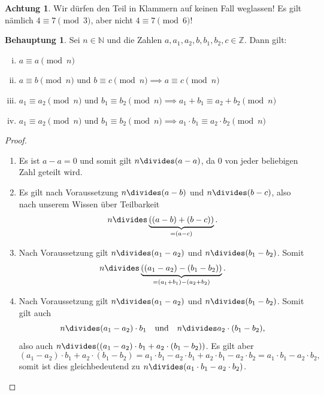\documentclass[a4paper,ngerman,12pt]{scrartcl}
\newcommand{\N}{\mathbb{N}}
\newcommand{\Z}{\mathbb{Z}}
\theoremstyle{definition}
\newtheorem{satz}{Behauptung}
\newtheorem*{acht}{Achtung}
\newenvironment{satzliste}{\begin{enumerate}[(i)]}{\end{enumerate}}
\newenvironment{beweisliste}{\begin{enumerate}[Zu (i):]}{\end{enumerate}}
\begin{document}
\begin{acht}
  Wir dürfen den Teil in Klammern auf keinen Fall weglassen! Es gilt nämlich
  $4 \equiv 7 \pmod{3}$, aber nicht $4 \equiv 7 \pmod{6}$!
\end{acht}

\begin{satz}
  Sei $n \in \N$ und die Zahlen $a, a_1, a_2, b, b_1, b_2, c \in \Z$. Dann gilt:
  \begin{satzliste}
    \item $a \equiv a \pmod{n}$
    \item $a \equiv b \pmod{n} \text{ und } b \equiv c \pmod{n} \implies a \equiv c \pmod{n}$
    \item $a_1 \equiv a_2 \pmod{n} \text{ und } b_1 \equiv b_2 \pmod{n} \implies a_1 + b_1 \equiv a_2 + b_2 \pmod{n}$
    \item $a_1 \equiv a_2 \pmod{n} \text{ und } b_1 \equiv b_2 \pmod{n} \implies a_1 \cdot b_1 \equiv a_2 \cdot b_2 \pmod{n}$
  \end{satzliste}
\end{satz}

\begin{proof}
  \begin{beweisliste}
    \item Es ist $a - a = 0$ und somit gilt $n \divides (a - a)$, da $0$ von jeder beliebigen Zahl geteilt wird.
    \item Es gilt nach Voraussetzung $n \divides (a-b)$ und $n \divides (b-c)$, also nach unserem Wissen über Teilbarkeit
    \[ n \divides \underbrace{\left((a-b) + (b-c)\right)}_{= (a - c)}. \]
    \item Nach Voraussetzung gilt $n \divides (a_1 - a_2)$ und $n \divides (b_1 - b_2)$. Somit
    \[ n \divides \underbrace{\left((a_1 - a_2) - (b_1 - b_2)\right)}_{= (a_1 + b_1) - (a_2 + b_2)}. \]
    \item Nach Voraussetzung gilt $n \divides (a_1 - a_2)$ und $n \divides (b_1 - b_2)$. Somit gilt auch
    \[ n \divides (a_1 - a_2) \cdot b_1 \quad \text{und} \quad n \divides a_2 \cdot (b_1 - b_2), \]
    also auch $n \divides ((a_1 - a_2) \cdot b_1 + a_2 \cdot (b_1 - b_2))$. Es gilt aber
    \[ (a_1 - a_2) \cdot b_1 + a_2 \cdot (b_1 - b_2) = a_1 \cdot b_1 - a_2 \cdot b_1 + a_2 \cdot b_1 - a_2 \cdot b_2 = a_1 \cdot b_1 - a_2 \cdot b_2, \]
    somit ist dies gleichbedeutend zu $n \divides (a_1 \cdot b_1 - a_2 \cdot b_2)$.\qedhere
  \end{beweisliste}
\end{proof}
\end{document}
